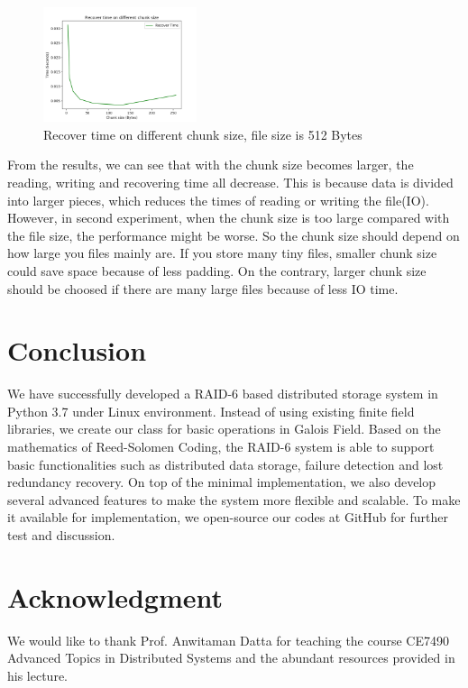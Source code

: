 \documentclass[journal]{IEEEtran}
\begin{document}
\begin{figure}[H]
	\centering
	\captionsetup{justification=centering}
	\includegraphics[width=0.4\textwidth]{fig/result_recover_small.png}
	\caption{Recover time on different chunk size, file size is 512 Bytes}
\end{figure}

From the results, we can see that with the chunk size becomes larger, the reading, writing and recovering time all decrease. This is because data is divided into larger pieces, which reduces the times of reading or writing the file(IO). However, in second experiment, when the chunk size is too large compared with the file size, the performance might be worse. So the chunk size should depend on how large you files mainly are. If you store many tiny files, smaller chunk size could save space because of less padding. On the contrary, larger chunk size should be choosed if there are many large files because of less IO time.

\section{Conclusion}
\label{sec6}
We have successfully developed a RAID-6 based distributed storage system in Python 3.7 under Linux environment. Instead of using existing finite field libraries, we create our class for basic operations in Galois Field. Based on the mathematics of Reed-Solomen Coding, the RAID-6 system is able to support basic functionalities such as distributed data storage, failure detection and lost redundancy recovery. On top of the minimal implementation, we also develop several advanced features to make the system more flexible and scalable. To make it available for implementation, we open-source our codes at GitHub for further test and discussion.

\section*{Acknowledgment}
We would like to thank Prof. Anwitaman Datta for teaching the course CE7490 Advanced Topics in Distributed Systems and the abundant resources provided in his lecture.
\end{document}
